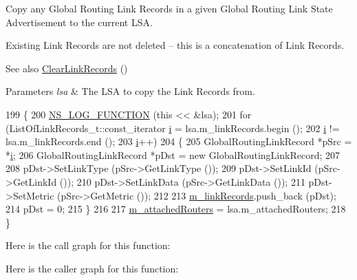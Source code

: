 Copy any Global Routing Link Records in a given Global Routing Link State Advertisement to the current L\+SA. 

Existing Link Records are not deleted -- this is a concatenation of Link Records.

\begin{DoxySeeAlso}{See also}
\hyperlink{classns3_1_1GlobalRoutingLSA_ab4ffe9bd37e80cba4f45025ec791bf41}{Clear\+Link\+Records} () 
\end{DoxySeeAlso}

\begin{DoxyParams}{Parameters}
{\em lsa} & The L\+SA to copy the Link Records from. \\
\hline
\end{DoxyParams}

\begin{DoxyCode}
199 \{
200   \hyperlink{log-macros-disabled_8h_a90b90d5bad1f39cb1b64923ea94c0761}{NS\_LOG\_FUNCTION} (\textcolor{keyword}{this} << &lsa);
201   \textcolor{keywordflow}{for} (ListOfLinkRecords\_t::const\_iterator \hyperlink{bernuolliDistribution_8m_a6f6ccfcf58b31cb6412107d9d5281426}{i} = lsa.m\_linkRecords.begin ();
202        \hyperlink{bernuolliDistribution_8m_a6f6ccfcf58b31cb6412107d9d5281426}{i} != lsa.m\_linkRecords.end (); 
203        \hyperlink{bernuolliDistribution_8m_a6f6ccfcf58b31cb6412107d9d5281426}{i}++)
204     \{
205       GlobalRoutingLinkRecord *pSrc = *\hyperlink{bernuolliDistribution_8m_a6f6ccfcf58b31cb6412107d9d5281426}{i};
206       GlobalRoutingLinkRecord *pDst = \textcolor{keyword}{new} GlobalRoutingLinkRecord;
207 
208       pDst->SetLinkType (pSrc->GetLinkType ());
209       pDst->SetLinkId (pSrc->GetLinkId ());
210       pDst->SetLinkData (pSrc->GetLinkData ());
211       pDst->SetMetric (pSrc->GetMetric ());
212 
213       \hyperlink{classns3_1_1GlobalRoutingLSA_a67b7b857643304afcd395debe0498363}{m\_linkRecords}.push\_back (pDst);
214       pDst = 0;
215     \}
216 
217   \hyperlink{classns3_1_1GlobalRoutingLSA_aa7b5e6e43ade3f813a12c47e4420b3eb}{m\_attachedRouters} = lsa.m\_attachedRouters;
218 \}
\end{DoxyCode}


Here is the call graph for this function\+:




Here is the caller graph for this function\+:


